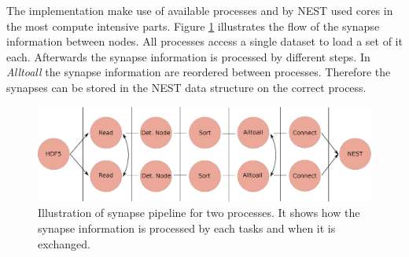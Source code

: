 \newpage
The implementation make use of available processes and by NEST used cores in the most compute intensive parts.
Figure \ref{fig:ConnectInsideIteration} illustrates the flow of the synapse information between nodes. 
All processes access a single dataset to load a set of it each. Afterwards the synapse information is processed by different steps.
In \emph{Alltoall} the synapse information are reordered between processes.
Therefore the synapses can be stored in the NEST data structure on the correct process.
\begin{figure}[ht!]
\centering
\includegraphics[scale=0.4]{pictures/Connect_inside_iteration.eps}
\caption{Illustration of synapse pipeline for two processes. It shows how the synapse information is processed by each tasks and when it is exchanged.}
\label{fig:ConnectInsideIteration}
\end{figure}

\newpage
